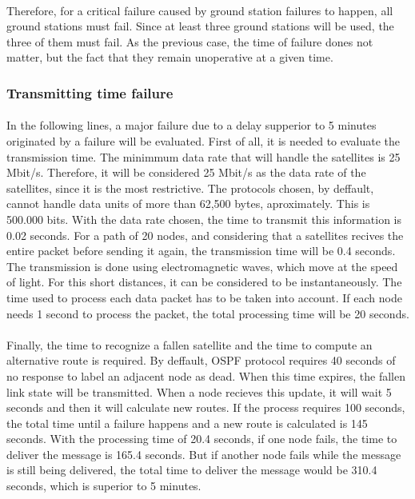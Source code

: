 \documentclass[12pt,a4paper]{report}
\begin{document}
\paragraph{}Therefore, for a critical failure caused by ground station failures to happen, all ground stations must fail. Since at least three ground stations will be used, the three of them must fail. As the previous case, the time of failure dones not matter, but the fact that they remain unoperative at a given time.

\subsubsection{Transmitting time failure}

\paragraph{}In the following lines, a major failure due to a delay supperior to 5 minutes originated by a failure will be evaluated. First of all, it is needed to evaluate the transmission time. The minimmum data rate that will handle the satellites is 25 Mbit/s. Therefore, it will be considered 25 Mbit/s as the data rate of the satellites, since it is the most restrictive. The protocols chosen, by deffault, cannot handle data units of more than 62,500 bytes, aproximately. This is 500.000 bits. With the data rate chosen, the time to transmit this information is 0.02 seconds. For a path of 20 nodes, and considering that a satellites recives the entire packet before sending it again, the transmission time will be 0.4 seconds. The transmission is done using electromagnetic waves, which move at the speed of light. For this short distances, it can be considered to be instantaneously. The time used to process each data packet has to be taken into account. If each node needs 1 second to process the packet, the total processing time will be 20 seconds. 

\paragraph{}Finally, the time to recognize a fallen satellite and the time to compute an alternative route is required. By deffault, OSPF protocol requires 40 seconds of no response to label an adjacent node as dead. When this time expires, the fallen link state will be transmitted. When a node recieves this update, it will wait 5 seconds and then it will calculate new routes. If the process requires 100 seconds, the total time until a failure happens and a new route is calculated is 145 seconds. With the processing time of 20.4 seconds, if one node fails, the time to deliver the message is 165.4 seconds. But if another node fails while the message is still being delivered, the total time to deliver the message would be 310.4 seconds, which is superior to 5 minutes.
\end{document}
